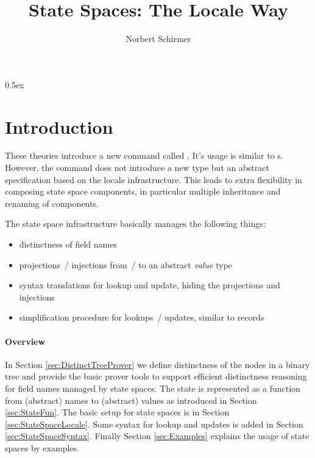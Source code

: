 \documentclass[11pt,a4paper]{article}
\begin{document}
\title{State Spaces: The Locale Way}
\author{Norbert Schirmer}
\maketitle

\tableofcontents

\parindent 0pt\parskip 0.5ex

\section{Introduction}

These theories introduce a new command called .
It's usage is similar to s. However, the command
does not introduce a new type but an abstract specification based on
the locale infrastructure. This leads to extra flexibility in
composing state space components, in particular multiple inheritance
and renaming of components.

The state space infrastructure basically manages the following things:
\begin{itemize}
\item distinctness of field names
\item projections~/ injections from~/ to an abstract \emph{value} type
\item syntax translations for lookup and update, hiding the
  projections and injections
\item simplification procedure for lookups~/ updates, similar to
  records
\end{itemize}


\paragraph{Overview}
In Section \ref{sec:DistinctTreeProver} we define distinctness of the
nodes in a binary tree and provide the basic prover tools to support
efficient distinctness reasoning for field names managed by state
spaces. The state is represented as a function from (abstract) names
to (abstract) values as introduced in Section \ref{sec:StateFun}. The
basic setup for state spaces is in Section
\ref{sec:StateSpaceLocale}. Some syntax for lookup and updates is
added in Section \ref{sec:StateSpaceSyntax}. Finally Section
\ref{sec:Examples} explains the usage of state spaces by examples.




%
%
\end{document}
